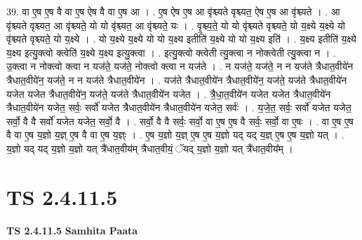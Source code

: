 \documentclass[17pt]{extarticle}
\begin{document}
39. वा ए॒ष ए॒ष वै वा ए॒ष ऐष वै वा ए॒ष आ । . ए॒ष ऐष ए॒ष आ वृ॑श्च्यते वृश्च्यत॒ ऐष ए॒ष आ वृ॑श्च्यते । . आ वृ॑श्च्यते वृश्च्यत॒ आ वृ॑श्च्यते॒ यो यो वृ॑श्च्यत॒ आ वृ॑श्च्यते॒ यः । . वृ॒श्च्य॒ते॒ यो यो वृ॑श्च्यते वृश्च्यते॒ यो य॒क्ष्ये य॒क्ष्ये यो वृ॑श्च्यते वृश्च्यते॒ यो य॒क्ष्ये । . यो य॒क्ष्ये य॒क्ष्ये यो यो य॒क्ष्य इतीति॑ य॒क्ष्ये यो यो य॒क्ष्य इति॑ । . य॒क्ष्य इतीति॑ य॒क्ष्ये य॒क्ष्य इत्यु॒क्त्वो क्त्वेति॑ य॒क्ष्ये य॒क्ष्य इत्यु॒क्त्वा । . इत्यु॒क्त्वो क्त्वेती त्यु॒क्त्वा न नोक्त्वेती त्यु॒क्त्वा न । . उ॒क्त्वा न नोक्त्वो क्त्वा न यज॑ते॒ यज॑ते॒ नोक्त्वो क्त्वा न यज॑ते । . न यज॑ते॒ यज॑ते॒ न न यज॑ते त्रैधात॒वीये॑न त्रैधात॒वीये॑न॒ यज॑ते॒ न न यज॑ते त्रैधात॒वीये॑न । . यज॑ते त्रैधात॒वीये॑न त्रैधात॒वीये॑न॒ यज॑ते॒ यज॑ते त्रैधात॒वीये॑न यजेत यजेत त्रैधात॒वीये॑न॒ यज॑ते॒ यज॑ते त्रैधात॒वीये॑न यजेत । . त्रै॒धा॒त॒वीये॑न यजेत यजेत त्रैधात॒वीये॑न त्रैधात॒वीये॑न यजेत॒ सर्वः॒ सर्वो॑ यजेत त्रैधात॒वीये॑न त्रैधात॒वीये॑न यजेत॒ सर्वः॑ । . य॒जे॒त॒ सर्वः॒ सर्वो॑ यजेत यजेत॒ सर्वो॒ वै वै सर्वो॑ यजेत यजेत॒ सर्वो॒ वै । . सर्वो॒ वै वै सर्वः॒ सर्वो॒ वा ए॒ष ए॒ष वै सर्वः॒ सर्वो॒ वा ए॒षः । . वा ए॒ष ए॒ष वै वा ए॒ष य॒ज्ञो य॒ज्ञ् ए॒ष वै वा ए॒ष य॒ज्ञ्ः । . ए॒ष य॒ज्ञो य॒ज्ञ् ए॒ष ए॒ष य॒ज्ञो यद् यद् य॒ज्ञ् ए॒ष ए॒ष य॒ज्ञो यत् । . य॒ज्ञो यद् यद् य॒ज्ञो य॒ज्ञो यत् त्रै॑धात॒वीय॑म् त्रैधात॒वीयं॒ ॅयद् य॒ज्ञो य॒ज्ञो यत् त्रै॑धात॒वीय᳚म् । \newline
\pagebreak
{}
\section*{ TS 2.4.11.5 }

\textbf{TS 2.4.11.5 } \newline
\textbf{Samhita Paata} \newline
\end{document}
